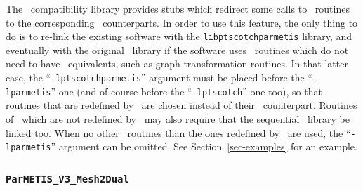 The \parmetis\ compatibility library provides stubs which redirect some
calls to \parmetis\ routines to the corresponding \ptscotch\ counterparts.
In order to use this feature, the only thing to do is to re-link the
existing software with the {\tt lib\lbo ptscotch\lbo parmetis} library, and
eventually with the original \parmetis\ library if the software uses
\parmetis\ routines which do not need to have \ptscotch\ equivalents, such
as graph transformation routines.
In that latter case, the ``{\tt -lptscotch\lbt parmetis}'' argument must be
placed before the ``{\tt -lparmetis}'' one (and of course before the
``{\tt -lptscotch}'' one too), so that routines that are redefined by
\ptscotch\ are chosen instead of their \parmetis\ counterpart. Routines
of \parmetis\ which are not redefined by \ptscotch\ may also require
that the sequential \metis\ library be linked too. When no other
\parmetis\ routines than the ones redefined by \ptscotch\ are used,
the ``{\tt -lparmetis}'' argument can be omitted. See
Section~\ref{sec-examples} for an example.

\subsubsection{\texttt{ParMETIS\_V3\_Mesh2Dual}}
\label{sec-lib-func-parmetis-meshtodual}

